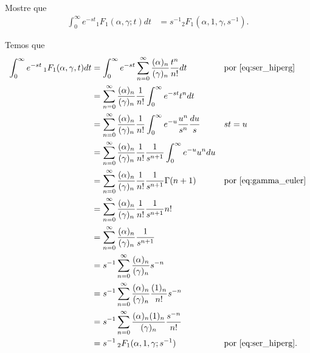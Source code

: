 \documentclass[a4paper,10pt, leqno, answers]{exam}  %
\begin{document}
\begin{questions}
    \question[Exame de 2006] Mostre que
    \begin{align*}
        \int_0^\infty e^{-s t} {}_1F_1(\alpha, \gamma; t) dt &= s^{-1} {}_2F_1(\alpha, 1, \gamma, s^{-1}).
    \end{align*}
    \begin{solution}
        Temos que
        \begin{align*}
            \int_0^\infty e^{-st} \,_1F_1(\alpha, \gamma, t) dt &= \int_0^\infty e^{-st} \sum_{n = 0}^\infty \frac{(\alpha)_n}{(\gamma)_n} \frac{t^n}{n!} dt && \text{por \eqref{eq:ser_hiperg}} \\
            &= \sum_{n = 0}^\infty \frac{(\alpha)_n}{(\gamma)_n} \frac{1}{n!} \int_0^\infty e^{-st} t^n dt \\
            &= \sum_{n = 0}^\infty \frac{(\alpha)_n}{(\gamma)_n} \frac{1}{n!} \int_0^\infty e^{-u} \frac{u^n}{s^n} \frac{du}{s} && st = u \\
            &= \sum_{n = 0}^\infty \frac{(\alpha)_n}{(\gamma)_n} \frac{1}{n!} \frac{1}{s^{n + 1}} \int_0^\infty e^{-u} u^n du \\
            &= \sum_{n = 0}^\infty \frac{(\alpha)_n}{(\gamma)_n} \frac{1}{n!} \frac{1}{s^{n + 1}} \Gamma(n + 1) && \text{por \eqref{eq:gamma_euler}} \\
            &= \sum_{n = 0}^\infty \frac{(\alpha)_n}{(\gamma)_n} \frac{1}{n!} \frac{1}{s^{n + 1}} n! \\
            &= \sum_{n = 0}^\infty \frac{(\alpha)_n}{(\gamma)_n} \frac{1}{s^{n + 1}} \\
            &= s^{-1} \sum_{n = 0}^\infty \frac{(\alpha)_n}{(\gamma)_n} s^{-n} \\
            &= s^{-1} \sum_{n = 0}^\infty \frac{(\alpha)_n}{(\gamma)_n} \frac{(1)_n}{n!} s^{-n} \\
            &= s^{-1} \sum_{n = 0}^\infty \frac{(\alpha)_n (1)_n}{(\gamma)_n} \frac{s^{-n}}{n!} \\
            &= s^{-1} \,_2F_1(\alpha, 1, \gamma; s^{-1}) && \text{por \eqref{eq:ser_hiperg}}.
        \end{align*}
    \end{solution}


\end{questions}
\end{document}

